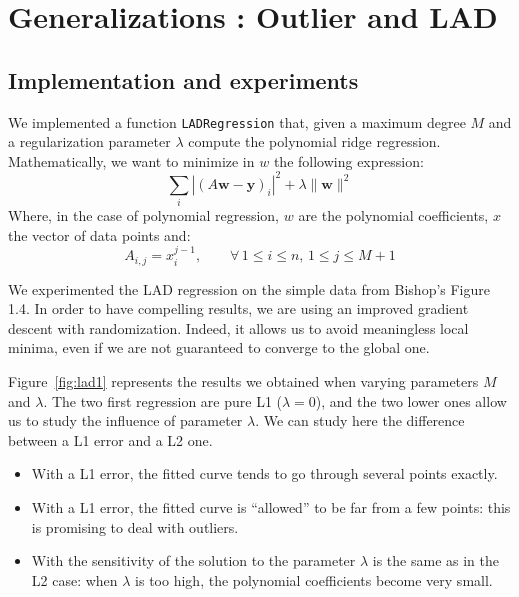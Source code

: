 \section{Generalizations : Outlier and LAD}
\subsection{Implementation and experiments}

We implemented a function {\tt LADRegression} that, given a maximum degree $M$ and a regularization parameter $\lambda$ compute the polynomial ridge regression. Mathematically, we want to minimize in $w$ the following expression:
\begin{equation*}
    \sum_i |(A\mathbf{w} - \mathbf{y})_i|^2 + \lambda \|\mathbf{w}\|^2
\end{equation*}
Where, in the case of polynomial regression, $w$ are the polynomial coefficients, $x$ the vector of data points and:
\begin{equation*}
    A_{i,j} = x_i^{j-1}, \qquad \forall \, 1 \leq i \leq n, \, 1 \leq j \leq M+1
\end{equation*}

We experimented the LAD regression on the simple data from Bishop's Figure 1.4. In order to have compelling results, we are using an improved gradient descent with randomization. Indeed, it allows us to avoid meaningless local minima, even if we are not guaranteed to converge to the global one.

Figure~\ref{fig:lad1} represents the results we obtained when varying parameters $M$ and $\lambda$. The two first regression are pure L1 ($\lambda = 0$), and the two lower ones allow us to study the influence of parameter $\lambda$. We can study here the difference between a L1 error and a L2 one.
\begin{itemize}
    \item With a L1 error, the fitted curve tends to go through several points exactly.
    \item With a L1 error, the fitted curve is ``allowed'' to be far from a few points: this is promising to deal with outliers.
    \item With the sensitivity of the solution to the parameter $\lambda$ is the same as in the L2 case: when $\lambda$ is too high, the polynomial coefficients become very small.
\end{itemize}

